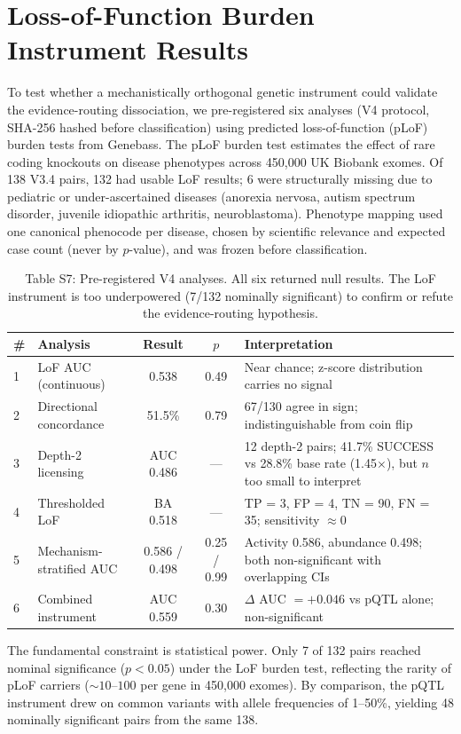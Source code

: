 \documentclass[11pt]{article}
\begin{document}
\section{Loss-of-Function Burden Instrument Results}
\label{supp:lof}

To test whether a mechanistically orthogonal genetic instrument could validate the evidence-routing dissociation, we pre-registered six analyses (V4 protocol, SHA-256 hashed before classification) using predicted loss-of-function (pLoF) burden tests from Genebass. The pLoF burden test estimates the effect of rare coding knockouts on disease phenotypes across 450,000 UK Biobank exomes. Of 138 V3.4 pairs, 132 had usable LoF results; 6 were structurally missing due to pediatric or under-ascertained diseases (anorexia nervosa, autism spectrum disorder, juvenile idiopathic arthritis, neuroblastoma). Phenotype mapping used one canonical phenocode per disease, chosen by scientific relevance and expected case count (never by $p$-value), and was frozen before classification.

\vspace{1em}
\begin{table}[H]
\centering
\caption{Table S7: Pre-registered V4 analyses. All six returned null results. The LoF instrument is too underpowered (7/132 nominally significant) to confirm or refute the evidence-routing hypothesis.}
\label{tab:lof_results}
\small
\begin{tabular}{llccp{4.5cm}}
\toprule
\# & Analysis & Result & $p$ & Interpretation \\
\midrule
1 & LoF AUC (continuous) & 0.538 & 0.49 & Near chance; z-score distribution carries no signal \\
2 & Directional concordance & 51.5\% & 0.79 & 67/130 agree in sign; indistinguishable from coin flip \\
3 & Depth-2 licensing & AUC 0.486 & --- & 12 depth-2 pairs; 41.7\% SUCCESS vs 28.8\% base rate (1.45$\times$), but $n$ too small to interpret \\
4 & Thresholded LoF & BA 0.518 & --- & TP = 3, FP = 4, TN = 90, FN = 35; sensitivity $\approx 0$ \\
5 & Mechanism-stratified AUC & 0.586 / 0.498 & 0.25 / 0.99 & Activity 0.586, abundance 0.498; both non-significant with overlapping CIs \\
6 & Combined instrument & AUC 0.559 & 0.30 & $\Delta$ AUC $= +0.046$ vs pQTL alone; non-significant \\
\bottomrule
\end{tabular}
\end{table}

The fundamental constraint is statistical power. Only 7 of 132 pairs reached nominal significance ($p < 0.05$) under the LoF burden test, reflecting the rarity of pLoF carriers (${\sim}10$--$100$ per gene in 450,000 exomes). By comparison, the pQTL instrument drew on common variants with allele frequencies of 1--50\%, yielding 48 nominally significant pairs from the same 138.
\end{document}
